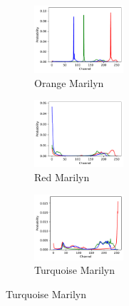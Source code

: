 \documentclass{article}
\begin{document}
\begin{figure}[ht]
  \centering
  \begin{subfigure}{0.3\textwidth}
    \centering
    \includegraphics[width=125px]{main_files/figure-latex/2_1_orange_marilyn_dist.pdf}
    \caption{Orange Marilyn}
    \label{fig:2_1_orange_marilyn_dist}
  \end{subfigure}
  \hfill
  \begin{subfigure}{0.3\textwidth}
    \centering
    \includegraphics[width=125px]{main_files/figure-latex/2_2_red_marilyn_dist.pdf}
    \caption{Red Marilyn}
    \label{fig:2_2_red_marilyn_dist}
  \end{subfigure}
  \hfill
  \begin{subfigure}{0.3\textwidth}
    \centering
    \includegraphics[width=125px]{main_files/figure-latex/2_3_turq_marilyn_dist.pdf}
    \caption{Turquoise Marilyn}
    \label{fig:2_3_turq_marilyn_dist}
  \end{subfigure}

  \vspace{1em}


\end{figure}
\end{document}
